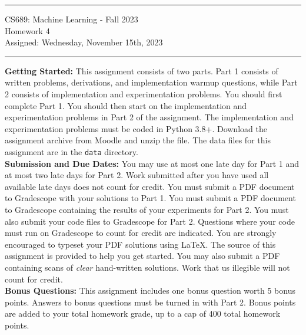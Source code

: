 \documentclass[11pt]{article}
\begin{document}
{\centering
  \rule{6.3in}{2pt}
  \vspace{1em}
  {\Large
    CS689: Machine Learning - Fall 2023\\
    Homework 4\\
  }
  \vspace{1em}
  Assigned: Wednesday, November 15th, 2023 \\
  \vspace{0.1em}
  \rule{6.3in}{1.5pt}
}
\vspace{1pc}

\textbf{Getting Started:} This assignment consists of two parts. Part 1 consists of written problems, derivations, and implementation warmup questions, while Part 2 consists of implementation and experimentation problems. You should first complete Part 1. You should then start on the implementation and experimentation problems in Part 2 of the assignment. The implementation and experimentation problems must be coded in Python 3.8+. Download the assignment archive from Moodle and unzip the file. The data files for this assignment are in the \verb|data| directory.\\

\textbf{Submission and Due Dates:} You may use at most one late day for Part 1 and at most two late days for Part 2. Work submitted after you have used all available late days does not count for credit. You must submit a PDF document to Gradescope with your solutions to Part 1. You must submit a PDF document to Gradescope containing the results of your experiments for Part 2. You must also submit your code files to Gradescope for Part 2. Questions where your code must run on Gradescope to count for credit are indicated. You are strongly encouraged to typeset your PDF solutions using LaTeX. The source of this assignment is provided to help you get started. You may also submit a PDF containing scans of \textit{clear} hand-written solutions. Work that us illegible will not count for credit.\\

\textbf{Bonus Questions:} This assignment includes one bonus question worth 5 bonus points. Answers to bonus questions must be turned in with Part 2. Bonus points are added to your total homework grade, up to a cap of 400 total homework points.\\ 
\end{document}
